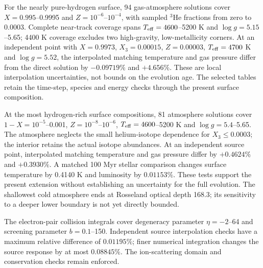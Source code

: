 \documentclass[11pt,letterpaper]{article}
\begin{document}
For the nearly pure-hydrogen surface, 94 gas-atmosphere solutions cover
$X=0.995$--0.9995 and $Z=10^{-6}$--$10^{-4}$, with sampled
$^3$He fractions from zero to 0.0003. Complete near-track coverage spans
$T_{\rm eff}=4600$--5200 K and $\log g=5.15$--5.65;
4400 K coverage excludes two high-gravity, low-metallicity corners.
At an independent point with $X=0.9973$, $X_3=0.00015$, $Z=0.00003$,
$T_{\rm eff}=4700$ K and $\log g=5.52$, the interpolated matching
temperature and gas pressure differ from the direct solution by
$-0.09719\%$ and $+4.656\%$. These are local interpolation uncertainties,
not bounds on the evolution age. The selected tables retain the time-step,
species and energy checks through the present surface composition.

At the most hydrogen-rich surface compositions, 81 atmosphere solutions
cover $1-X=10^{-5}$--0.001, $Z=10^{-8}$--$10^{-6}$,
$T_{\rm eff}=4600$--5200 K and $\log g=5.4$--5.65.
The atmosphere neglects the small helium-isotope dependence for
$X_3\leq0.0003$; the interior retains the actual isotope abundances.
At an independent source point, interpolated matching temperature and
gas pressure differ by $+0.4624\%$ and $+0.3930\%$.
A matched 100 Myr stellar comparison changes surface temperature by
0.4140 K and luminosity by $0.01153\%$. These tests support the present
extension without establishing an uncertainty for the full evolution.
The shallowest cold atmosphere ends at Rosseland optical depth 168.3;
its sensitivity to a deeper lower boundary is not yet directly bounded.

The electron-pair collision integrals cover degeneracy parameter
$\eta=-2$--64 and screening parameter $b=0.1$--150. Independent source
interpolation checks have a maximum relative difference of $0.01195\%$;
finer numerical integration changes the source response by at most
$0.08845\%$. The ion-scattering domain and conservation checks remain enforced.
\end{document}
